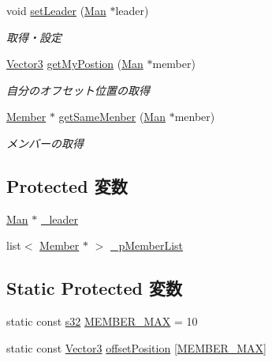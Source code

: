 \begin{DoxyCompactItemize}
\item 
void \hyperlink{class_squad_a2cc19ba85f2f940a18bdcffe86398e7f}{set\-Leader} (\hyperlink{class_man}{Man} $\ast$leader)
\begin{DoxyCompactList}\small\item\em 取得・設定 \end{DoxyCompactList}\item 
\hyperlink{struct_vector3}{Vector3} \hyperlink{class_squad_a8500396f2202f8b6cfbeb58a60b50385}{get\-My\-Postion} (\hyperlink{class_man}{Man} $\ast$member)
\begin{DoxyCompactList}\small\item\em 自分のオフセット位置の取得 \end{DoxyCompactList}\item 
\hyperlink{struct_member}{Member} $\ast$ \hyperlink{class_squad_aa68455ebcf1e6c341ec287692b5df964}{get\-Same\-Menber} (\hyperlink{class_man}{Man} $\ast$menber)
\begin{DoxyCompactList}\small\item\em メンバーの取得 \end{DoxyCompactList}\end{DoxyCompactItemize}

\subsection*{Protected 変数}
\begin{DoxyCompactItemize}
\item 
\hyperlink{class_man}{Man} $\ast$ \hyperlink{class_squad_a8b59302b991f8a7378997a8b94ff49cb}{\-\_\-leader}
\item 
list$<$ \hyperlink{struct_member}{Member} $\ast$ $>$ \hyperlink{class_squad_aa95fcbc892273659b1e342e6dd522573}{\-\_\-p\-Member\-List}
\end{DoxyCompactItemize}
\subsection*{Static Protected 変数}
\begin{DoxyCompactItemize}
\item 
static const \hyperlink{_main_8h_a0ce6887c26c1c49ad3be5710dd42bfd6}{s32} \hyperlink{class_squad_a9cdd878b045c7242f54a169d02dc5e18}{M\-E\-M\-B\-E\-R\-\_\-\-M\-A\-X} = 10
\item 
static const \hyperlink{struct_vector3}{Vector3} \hyperlink{class_squad_a961d7d3aaf28d3d6174f220c8c298718}{offset\-Position} \mbox{[}\hyperlink{class_squad_a9cdd878b045c7242f54a169d02dc5e18}{M\-E\-M\-B\-E\-R\-\_\-\-M\-A\-X}\mbox{]}
\end{DoxyCompactItemize}


